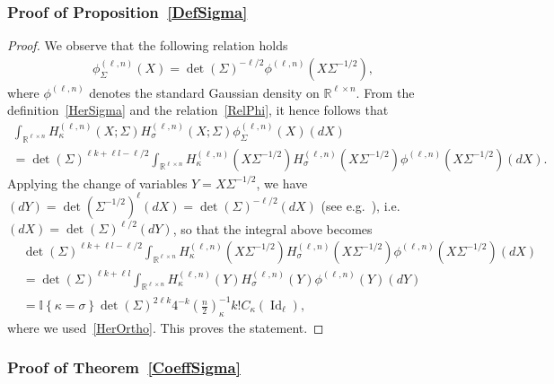 \documentclass[10pt]{amsart}
\theoremstyle{definition}\newtheorem{defi}[theo]{Definition}\newtheorem{rema}[theo]{Remark}\newtheorem{exam}[theo]{Example}\newtheorem{exem}[theo]{Example}\newtheorem{nota}[theo]{Notation}
\DeclareMathOperator{\Id}{Id}
\newcommand{\R}{\mathbb{R}}
\newcommand{\ind}[1]{\mathbb{I}
\left\{#1\right\}}
\begin{document}
\subsubsection*{Proof of Proposition~\ref{DefSigma}}

\begin{proof}
We observe that the following relation holds
\begin{gather}\label{RelPhi}
\phi^{(\ell,n)}_{\Sigma}(X) = \det(\Sigma)^{-\ell/2} \phi^{(\ell,n)}\left(X\Sigma^{-1/2}\right),
\end{gather}
where $\phi^{(\ell,n)}$ denotes the standard Gaussian density on $\R^{\ell \times n}$. From the definition~\eqref{HerSigma} and the relation~\eqref{RelPhi}, it hence follows that
\begin{multline*}
\int_{\R^{\ell \times n}} H^{(\ell,n)}_{\kappa}(X;\Sigma) H^{(\ell,n)}_{\sigma}(X;\Sigma)\phi^{(\ell,n)}_{\Sigma}(X)(dX) \\
= \det(\Sigma)^{\ell k+\ell l-\ell/2}\int_{\R^{\ell\times n} } H_{\kappa}^{(\ell,n)}\left(X\Sigma^{-1/2}\right) H_{\sigma}^{(\ell,n)}\left(X\Sigma^{-1/2}\right) \phi^{(\ell,n)}\left(X\Sigma^{-1/2}\right) (dX).
\end{multline*}
Applying the change of variables $Y=X\Sigma^{-1/2}$, we have $(dY) = \det(\Sigma^{-1/2})^{\ell}(dX) = \det(\Sigma)^{-\ell/2} (dX)$ (see e.g.~\cite[Theorem~2.1.5]{Muir}), i.e. $(dX) = \det(\Sigma)^{\ell/2} (dY)$, so that the integral above becomes
\begin{align*}
&\det(\Sigma)^{\ell k+\ell l-\ell/2}\int_{\R^{\ell \times n}} H_{\kappa}^{(\ell,n)}\left(X\Sigma^{-1/2}\right) H_{\sigma}^{(\ell,n)}(X\Sigma^{-1/2}) \phi^{(\ell,n)}\left(X\Sigma^{-1/2}\right) (dX) \\
&= \det(\Sigma)^{\ell k+\ell l }\int_{\R^{\ell \times n}} H_{\kappa}^{(\ell,n)}(Y) H_{\sigma}^{(\ell,n)}(Y) \phi^{(\ell,n)}(Y) (dY) \\
&= \ind{\kappa=\sigma} \det(\Sigma)^{2\ell k}4^{-k}\left(\frac{n}{2}\right)_{\kappa}^{-1} k !C_{\kappa}(\Id_{\ell}),
\end{align*}
where we used~\eqref{HerOrtho}. This proves the statement.
\end{proof}

\subsubsection*{Proof of Theorem~\ref{CoeffSigma}}
\end{document}
